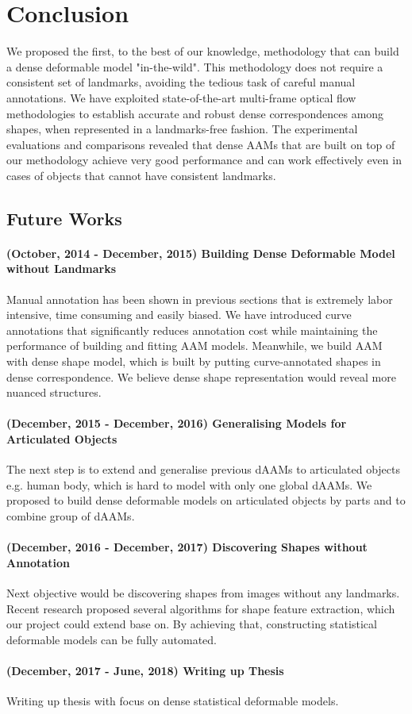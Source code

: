 
\chapter{Conclusion}
\label{ch:conclusions}

We proposed the first, to the best of our knowledge, methodology that can build a dense deformable model "in-the-wild". This methodology does not require a consistent set of landmarks, avoiding the tedious task of careful manual annotations. We have exploited state-of-the-art multi-frame optical flow methodologies to establish accurate and robust dense correspondences among shapes, when represented in a landmarks-free fashion. The experimental evaluations and comparisons revealed that dense AAMs that are built on top of our methodology achieve very good performance and can work effectively even in cases of objects that cannot have consistent landmarks.

\section{Future Works}

\subsubsection{(October, 2014 - December, 2015) Building Dense Deformable Model without Landmarks} 
Manual annotation has been shown in previous sections that is extremely labor intensive, time consuming and easily biased. We have introduced curve annotations that significantly reduces annotation cost while maintaining the performance of building and fitting AAM models. Meanwhile, we build AAM with dense shape model, which is built by putting curve-annotated shapes in dense correspondence. We believe dense shape representation would reveal more nuanced structures.

\subsubsection{(December, 2015 - December, 2016) Generalising Models for Articulated Objects}
The next step is to extend and generalise previous dAAMs to articulated objects e.g. human body, which is hard to model with only one global dAAMs. We proposed to build dense deformable models on articulated objects by parts and to combine group of dAAMs.

\subsubsection{(December, 2016 - December, 2017) Discovering Shapes without Annotation}
Next objective would be discovering shapes from images without any landmarks. Recent research \cite{zhou2015flowweb, jia2014roml, jiang2009learning} proposed several algorithms for shape feature extraction, which our project could extend base on. By achieving that, constructing statistical deformable models can be fully automated.

\subsubsection{(December, 2017 - June, 2018) Writing up Thesis}
Writing up thesis with focus on dense statistical deformable models.